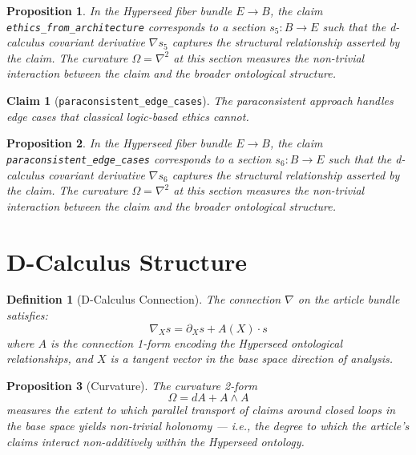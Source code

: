 \documentclass{article}
\newtheorem{claim}{Claim}
\newtheorem{definition}{Definition}
\newtheorem{proposition}{Proposition}
\begin{document}
\begin{proposition}
In the Hyperseed fiber bundle $E \to B$, the claim \texttt{ethics_from_architecture} corresponds to a section $s_5: B \to E$ such that the d-calculus covariant derivative $\nabla s_5$ captures the structural relationship asserted by the claim. The curvature $\Omega = \nabla^2$ at this section measures the non-trivial interaction between the claim and the broader ontological structure.
\end{proposition}

\begin{claim}[\texttt{paraconsistent_edge_cases}]
The paraconsistent approach handles edge cases that classical logic-based ethics cannot.
\end{claim}

\begin{proposition}
In the Hyperseed fiber bundle $E \to B$, the claim \texttt{paraconsistent_edge_cases} corresponds to a section $s_6: B \to E$ such that the d-calculus covariant derivative $\nabla s_6$ captures the structural relationship asserted by the claim. The curvature $\Omega = \nabla^2$ at this section measures the non-trivial interaction between the claim and the broader ontological structure.
\end{proposition}

\section{D-Calculus Structure}

\begin{definition}[D-Calculus Connection]
The connection $\nabla$ on the article bundle satisfies:
\begin{equation}
  \nabla_X s = \partial_X s + A(X) \cdot s
\end{equation}
where $A$ is the connection 1-form encoding the Hyperseed ontological relationships, and $X$ is a tangent vector in the base space direction of analysis.
\end{definition}

\begin{proposition}[Curvature]
The curvature 2-form
\begin{equation}
  \Omega = dA + A \wedge A
\end{equation}
measures the extent to which parallel transport of claims around closed loops in the base space yields non-trivial holonomy --- i.e., the degree to which the article's claims interact non-additively within the Hyperseed ontology.
\end{proposition}
\end{document}
